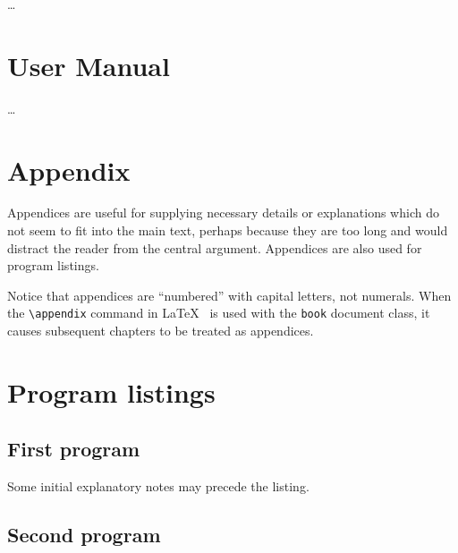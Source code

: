 \documentclass[12pt,openany,a4paper]{book}
\begin{document}
\ldots 

\chapter{User Manual}

\ldots

\appendix


\newpage
{}
\mbox{}
\newpage



\chapter{Appendix}

Appendices are useful for supplying necessary details or explanations
which do not seem to fit into the main text, perhaps because they are
too long and would distract the reader from the central argument.
Appendices are also used for program listings.

Notice that appendices are ``numbered'' with capital letters, not
numerals.  When the \verb+\appendix+ command in
\LaTeX~\cite[p.\,175]{lamport} is used with the \texttt{book} document
class, it causes subsequent chapters to be treated as appendices.

\chapter{Program listings}

\section{First program}

Some initial explanatory notes may precede the listing.

\section{Second program}
\end{document}
